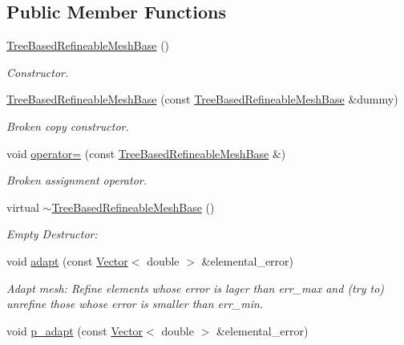 \subsection*{Public Member Functions}
\begin{DoxyCompactItemize}
\item 
\hyperlink{classoomph_1_1TreeBasedRefineableMeshBase_aae094b3c6b773c0dbfbeba056c83eac6}{Tree\+Based\+Refineable\+Mesh\+Base} ()
\begin{DoxyCompactList}\small\item\em Constructor. \end{DoxyCompactList}\item 
\hyperlink{classoomph_1_1TreeBasedRefineableMeshBase_acc9ef07314f9eebbf8f28862e122e66a}{Tree\+Based\+Refineable\+Mesh\+Base} (const \hyperlink{classoomph_1_1TreeBasedRefineableMeshBase}{Tree\+Based\+Refineable\+Mesh\+Base} \&dummy)
\begin{DoxyCompactList}\small\item\em Broken copy constructor. \end{DoxyCompactList}\item 
void \hyperlink{classoomph_1_1TreeBasedRefineableMeshBase_a3f8fcf0452b612c6e8160d909af612fe}{operator=} (const \hyperlink{classoomph_1_1TreeBasedRefineableMeshBase}{Tree\+Based\+Refineable\+Mesh\+Base} \&)
\begin{DoxyCompactList}\small\item\em Broken assignment operator. \end{DoxyCompactList}\item 
virtual \hyperlink{classoomph_1_1TreeBasedRefineableMeshBase_ab9edfe81d5b9fc03fbb98c5ff601a260}{$\sim$\+Tree\+Based\+Refineable\+Mesh\+Base} ()
\begin{DoxyCompactList}\small\item\em Empty Destructor\+: \end{DoxyCompactList}\item 
void \hyperlink{classoomph_1_1TreeBasedRefineableMeshBase_ac98d4120b99d5c6cbcf7225a9ee5648d}{adapt} (const \hyperlink{classoomph_1_1Vector}{Vector}$<$ double $>$ \&elemental\+\_\+error)
\begin{DoxyCompactList}\small\item\em Adapt mesh\+: Refine elements whose error is lager than err\+\_\+max and (try to) unrefine those whose error is smaller than err\+\_\+min. \end{DoxyCompactList}\item 
void \hyperlink{classoomph_1_1TreeBasedRefineableMeshBase_acec4254dc1b7c75870cfa0bd0c4e363e}{p\+\_\+adapt} (const \hyperlink{classoomph_1_1Vector}{Vector}$<$ double $>$ \&elemental\+\_\+error)

\end{DoxyCompactItemize}
